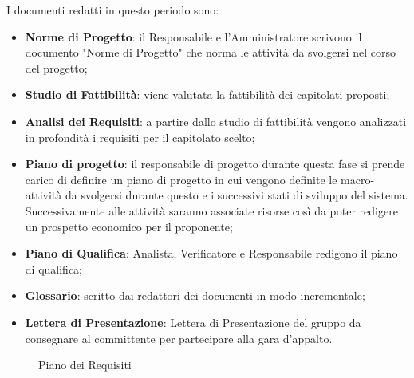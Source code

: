 {{	I documenti redatti in questo periodo sono:
	\begin{itemize}
		\item \textbf{Norme di Progetto}: il Responsabile e l'Amministratore scrivono il documento "Norme di Progetto" che norma le attività da svolgersi nel corso del progetto;
		\item \textbf{Studio di Fattibilità}: viene valutata la fattibilità dei capitolati proposti;
		\item \textbf{Analisi dei Requisiti}: a partire dallo studio di fattibilità vengono analizzati in profondità i requisiti per il capitolato scelto;
		\item \textbf{Piano di progetto}: il responsabile di progetto durante questa fase si prende carico di definire un piano di progetto in cui vengono definite le macro-attività da svolgersi durante questo e i successivi stati di sviluppo del sistema. Successivamente alle attività saranno associate risorse così da poter redigere un prospetto economico per il proponente;
		\item \textbf{Piano di Qualifica}: Analista, Verificatore e Responsabile redigono il piano di qualifica;
		\item \textbf{Glossario}: scritto dai redattori dei documenti in modo incrementale;
		\item \textbf{Lettera di Presentazione}: Lettera di Presentazione del gruppo da consegnare al committente per partecipare alla gara d'appalto.
	\end{itemize}

	\begin{landscape}
		\thispagestyle{empty}
		\begin{figure}[H]
			\parbox[c][\textwidth][s]{\linewidth}{
			\centering
			\vspace*{\fill}
			\vspace*{\fill}
			\label{fig:pianorequisiti}
			\caption{Piano dei Requisiti}}
		\end{figure}
	\end{landscape}

}}
